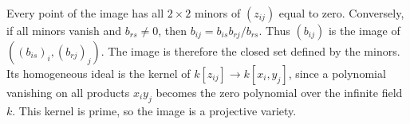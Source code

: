 Every point of the image has all $2\times2$ minors of $(z_{ij})$ equal to zero. Conversely, if all minors vanish and $b_{rs}\ne0$, then $b_{ij}=b_{is}b_{rj}/b_{rs}$. Thus $(b_{ij})$ is the image of $((b_{is})_i,(b_{rj})_j)$. The image is therefore the closed set defined by the minors. Its homogeneous ideal is the kernel of $k[z_{ij}]\to k[x_i,y_j]$, since a polynomial vanishing on all products $x_i y_j$ becomes the zero polynomial over the infinite field $k$. This kernel is prime, so the image is a projective variety.
